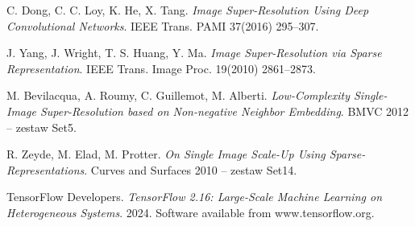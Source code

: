 \documentclass[11pt]{article}
\begin{document}
\begin{thebibliography}{9}\setlength{\itemsep}{0pt}

C. Dong, C. C. Loy, K. He, X. Tang.  
\textit{Image Super-Resolution Using Deep Convolutional Networks}.  
IEEE Trans. PAMI 37(2016)  295–307.

J. Yang, J. Wright, T. S. Huang, Y. Ma.  
\textit{Image Super-Resolution via Sparse Representation}.  
IEEE Trans. Image Proc. 19(2010)  2861–2873.  %

M. Bevilacqua, A. Roumy, C. Guillemot, M. Alberti.  
\textit{Low-Complexity Single-Image Super-Resolution
  based on Non-negative Neighbor Embedding}.  
BMVC 2012 – zestaw Set5.

R. Zeyde, M. Elad, M. Protter.  
\textit{On Single Image Scale-Up Using
Sparse-Representations}.  
Curves and Surfaces 2010 – zestaw Set14.

TensorFlow Developers.  
\textit{TensorFlow 2.16: Large-Scale Machine Learning on Heterogeneous Systems}.  
2024.  Software available from www.tensorflow.org.

\end{thebibliography}
\end{document}
